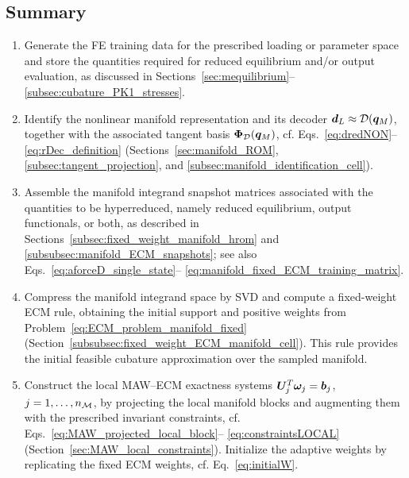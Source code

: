 \documentclass[11pt,a4paper]{article}
\begin{document}
\subsection{Summary}
\label{sec:summary}
\begin{BOX}
\caption{Offline construction of a MAW--ECM rule.}
\label{box:MAW_ECM_summary}

\footnotesize

\begin{enumerate}
\setlength{\itemsep}{2pt}
\setlength{\parsep}{0pt}

\item Generate the FE training data for the prescribed loading or parameter
space and store the quantities required for reduced equilibrium and/or output
evaluation, as discussed in
Sections~\ref{sec:mequilibrium}--\ref{subsec:cubature_PK1_stresses}.
%

\item Identify the nonlinear manifold representation and its decoder
\(\bm{d}_L\approx\mathcal{\boldsymbol{D}}(\bm{q}_M)\), together with the associated tangent basis
\(\bm{\Phi}_{\mathcal{D}}(\bm{q}_M)\), cf.
Eqs.~\eqref{eq:dredNON}--\eqref{eq:rDec_definition}
(Sections~\ref{sec:manifold_ROM},
\ref{subsec:tangent_projection}, and
\ref{subsec:manifold_identification_cell}).

\item Assemble the manifold integrand snapshot matrices associated with the
quantities to be hyperreduced, namely reduced equilibrium, output functionals,
or both, as described in
Sections~\ref{subsec:fixed_weight_manifold_hrom} and
\ref{subsubsec:manifold_ECM_snapshots}; see also
Eqs.~\eqref{eq:aforceD_single_state}--%
\eqref{eq:manifold_fixed_ECM_training_matrix}.

\item Compress the manifold integrand space by SVD and compute a fixed-weight
ECM rule, obtaining the initial support and positive weights from
Problem~\eqref{eq:ECM_problem_manifold_fixed}
(Section~\ref{subsubsec:fixed_weight_ECM_manifold_cell}). This rule provides
the initial feasible cubature approximation over the sampled manifold.

\item Construct the local MAW--ECM exactness systems
\(\bm{U}_{j}^{T}\bm{\omega}_{j}=\bm{b}_{j}\),
\(j=1,\ldots,n_{\mathcal{M}}\), by projecting the local manifold blocks and augmenting them
with the prescribed invariant constraints, cf.
Eqs.~\eqref{eq:MAW_projected_local_block}--%
\eqref{eq:constraintsLOCAL}
(Section~\ref{sec:MAW_local_constraints}). Initialize the adaptive weights by
replicating the fixed ECM weights, cf. Eq.~\eqref{eq:initialW}.


\end{enumerate}
\end{BOX}
\end{document}
